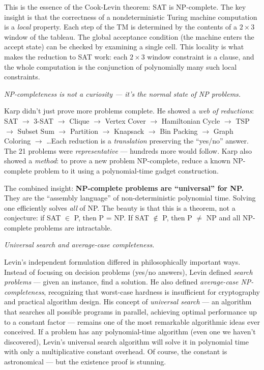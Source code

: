 This is the essence of the Cook-Levin theorem: SAT is NP-complete. The key insight is that the correctness of a nondeterministic Turing machine computation is a \emph{local} property. Each step of the TM is determined by the contents of a $2 \times 3$ window of the tableau. The global acceptance condition (the machine enters the accept state) can be checked by examining a single cell. This locality is what makes the reduction to SAT work: each $2 \times 3$ window constraint is a clause, and the whole computation is the conjunction of polynomially many such local constraints.

\emph{NP-completeness is not a curiosity — it's the \emph{normal} state of NP problems.}

Karp didn't just prove more problems complete. He showed a \emph{web of reductions}: SAT $\to$ 3-SAT $\to$ Clique $\to$ Vertex Cover $\to$ Hamiltonian Cycle $\to$ TSP $\to$ Subset Sum $\to$ Partition $\to$ Knapsack $\to$ Bin Packing $\to$ Graph Coloring $\to$ \dots Each reduction is a \emph{translation} preserving the ``yes/no'' answer. The 21 problems were \emph{representative} — hundreds more would follow. Karp also showed a \emph{method}: to prove a new problem NP-complete, reduce a known NP-complete problem to it using a polynomial-time gadget construction.

The combined insight: \textbf{NP-complete problems are ``universal'' for NP.} They are the ``assembly language'' of non-deterministic polynomial time. Solving one efficiently solves \emph{all} of NP. The beauty is that this is a theorem, not a conjecture: if SAT $\in$ P, then P = NP. If SAT $\notin$ P, then P $\neq$ NP and all NP-complete problems are intractable.

\emph{Universal search and average-case completeness.}

Levin's independent formulation differed in philosophically important ways. Instead of focusing on decision problems (yes/no answers), Levin defined \emph{search problems} — given an instance, find a solution. He also defined \emph{average-case NP-completeness}, recognizing that worst-case hardness is insufficient for cryptography and practical algorithm design. His concept of \emph{universal search} — an algorithm that searches all possible programs in parallel, achieving optimal performance up to a constant factor — remains one of the most remarkable algorithmic ideas ever conceived. If a problem has any polynomial-time algorithm (even one we haven't discovered), Levin's universal search algorithm will solve it in polynomial time with only a multiplicative constant overhead. Of course, the constant is astronomical — but the existence proof is stunning.

